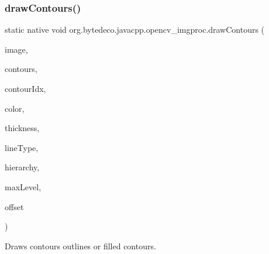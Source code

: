 \subsubsection{\texorpdfstring{draw\+Contours()}{drawContours()}}
{\footnotesize\ttfamily static native void org.\+bytedeco.\+javacpp.\+opencv\+\_\+imgproc.\+draw\+Contours (\begin{DoxyParamCaption}\item[{@By\+Val Mat}]{image,  }\item[{@By\+Val Mat\+Vector}]{contours,  }\item[{int}]{contour\+Idx,  }\item[{@Const @By\+Ref Scalar}]{color,  }\item[{int}]{thickness,  }\item[{int}]{line\+Type,  }\item[{@By\+Val(null\+Value=\char`\"{}cv\+::\+Input\+Array(cv\+::no\+Array())\char`\"{}) Mat}]{hierarchy,  }\item[{int}]{max\+Level,  }\item[{@By\+Val(null\+Value=\char`\"{}cv\+::\+Point()\char`\"{}) Point}]{offset }\end{DoxyParamCaption})\hspace{0.3cm}{\ttfamily [static]}}



Draws contours outlines or filled contours. 

